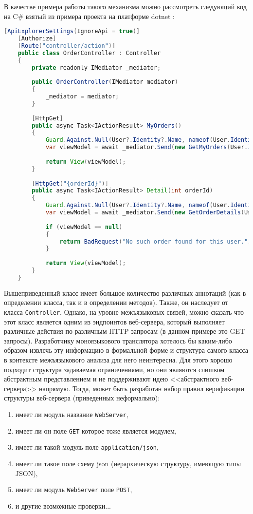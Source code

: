 В качестве примера работы такого механизма можно рассмотреть следующий код на C\# взятый из примера проекта на платформе dotnet \cite{eShopOnWeb}:

\begin{lstlisting}[language=Java,style=simplecode,caption={Контроллер на языке C\#}]
    [ApiExplorerSettings(IgnoreApi = true)]
    [Authorize]
    [Route("controller/action")]
    public class OrderController : Controller
    {
        private readonly IMediator _mediator;
    
        public OrderController(IMediator mediator)
        {
            _mediator = mediator;
        }
    
        [HttpGet]
        public async Task<IActionResult> MyOrders()
        {   
            Guard.Against.Null(User?.Identity?.Name, nameof(User.Identity.Name));
            var viewModel = await _mediator.Send(new GetMyOrders(User.Identity.Name));
    
            return View(viewModel);
        }
    
        [HttpGet("{orderId}")]
        public async Task<IActionResult> Detail(int orderId)
        {
            Guard.Against.Null(User?.Identity?.Name, nameof(User.Identity.Name));
            var viewModel = await _mediator.Send(new GetOrderDetails(User.Identity.Name, orderId));
    
            if (viewModel == null)
            {
                return BadRequest("No such order found for this user.");
            }
    
            return View(viewModel);
        }
    }
\end{lstlisting}

Вышеприведенный класс имеет большое количество различных аннотаций (как в определении класса, так и в определении
методов). Также, он наследует от класса \texttt{Controller}. Однако, на уровне межъязыковых связей, можно
сказать что этот класс является одним из эндпоинтов веб-сервера, который выполняет различные действия по различным
HTTP запросам (в данном примере это GET запросы). Разработчику моноязыкового транслятора хотелось бы каким-либо образом извлечь эту информацию
в формальной форме и структура самого класса в контексте межъязыкового анализа для него
неинтересна. Для этого хорошо подходит структура задаваемая ограничениями, но они являются слишком абстрактным представлением
и не поддерживают идею <<абстрактного веб-сервера>> напрямую. Тогда, может быть разработан набор правил верификации
структуры веб-сервера (приведенных неформально):
\begin{enumerate}[1)]
    \item имеет ли модуль название \texttt{WebServer},
    \item имеет ли он поле \texttt{GET} которое тоже является модулем,
    \item имеет ли такой модуль поле \texttt{application/json}, 
    \item имеет ли такое поле схему json (иерархическую структуру, имеющую типы JSON),
    \item имеет ли модуль \texttt{WebServer} поле \texttt{POST},
    \item и другие возможные проверки...
\end{enumerate}

